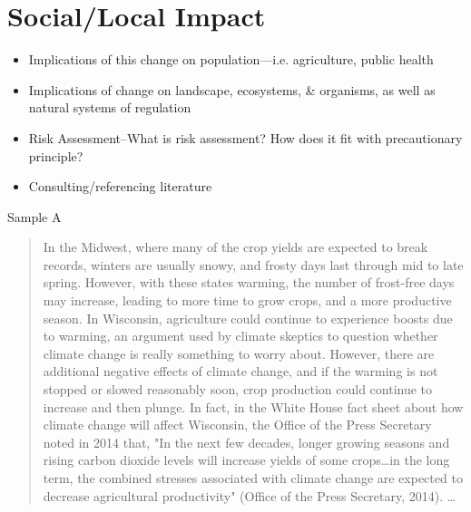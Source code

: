 \documentclass{article}\usepackage[]{graphicx}\usepackage[]{color}
\begin{document}
\section{Social/Local Impact}
\begin{itemize}
  \item Implications of this change on population—i.e. agriculture, public health
\item Implications of change on landscape, ecosystems, \& organisms, as well as natural systems of regulation
\item Risk Assessment--What is risk assessment? How does it fit with precautionary principle?
\item Consulting/referencing literature
\end{itemize}

Sample A
\begin{quote}
In the Midwest, where many of the crop yields are expected to break records, winters are usually snowy, and frosty days last through mid to late spring. However, with these states warming, the number of frost-free days may increase, leading to more time to grow crops, and a more productive season. In Wisconsin, agriculture could continue to experience boosts due to warming, an argument used by climate skeptics to question whether climate change is really something to worry about. However, there are additional negative effects of climate change, and if the warming is not stopped or slowed reasonably soon, crop production could continue to increase and then plunge. In fact, in the White House fact sheet about how climate change will affect 
Wisconsin, the Office of the Press Secretary noted in 2014 that, "In the next few decades, longer growing seasons and rising carbon dioxide levels will increase yields of some crops\ldots in the long term, the combined stresses associated with climate change are expected to decrease agricultural productivity" (Office of the Press Secretary, 2014). 
\ldots

\end{quote}
\end{document}

